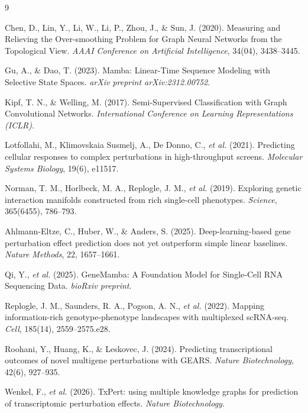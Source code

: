 \documentclass{bioinfo}
\begin{document}
\small
\begin{thebibliography}{9}

Chen, D., Lin, Y., Li, W., Li, P., Zhou, J., \& Sun, J. (2020). Measuring and Relieving the Over-smoothing Problem for Graph Neural Networks from the Topological View. \textit{AAAI Conference on Artificial Intelligence}, 34(04), 3438--3445.

Gu, A., \& Dao, T. (2023). Mamba: Linear-Time Sequence Modeling with Selective State Spaces. \textit{arXiv preprint arXiv:2312.00752}.

Kipf, T. N., \& Welling, M. (2017). Semi-Supervised Classification with Graph Convolutional Networks. \textit{International Conference on Learning Representations (ICLR)}.

Lotfollahi, M., Klimovskaia Susmelj, A., De Donno, C., \textit{et al.} (2021). Predicting cellular responses to complex perturbations in high-throughput screens. \textit{Molecular Systems Biology}, 19(6), e11517.

Norman, T. M., Horlbeck, M. A., Replogle, J. M., \textit{et al.} (2019). Exploring genetic interaction manifolds constructed from rich single-cell phenotypes. \textit{Science}, 365(6455), 786--793.

Ahlmann-Eltze, C., Huber, W., \& Anders, S. (2025). Deep-learning-based gene perturbation effect prediction does not yet outperform simple linear baselines. \textit{Nature Methods}, 22, 1657--1661.

Qi, Y., \textit{et al.} (2025). GeneMamba: A Foundation Model for Single-Cell RNA Sequencing Data. \textit{bioRxiv preprint}.

Replogle, J. M., Saunders, R. A., Pogson, A. N., \textit{et al.} (2022). Mapping information-rich genotype-phenotype landscapes with multiplexed scRNA-seq. \textit{Cell}, 185(14), 2559--2575.e28.

Roohani, Y., Huang, K., \& Leskovec, J. (2024). Predicting transcriptional outcomes of novel multigene perturbations with GEARS. \textit{Nature Biotechnology}, 42(6), 927--935.

Wenkel, F., \textit{et al.} (2026). TxPert: using multiple knowledge graphs for prediction of transcriptomic perturbation effects. \textit{Nature Biotechnology}.

\end{thebibliography}
\normalsize
\end{document}

